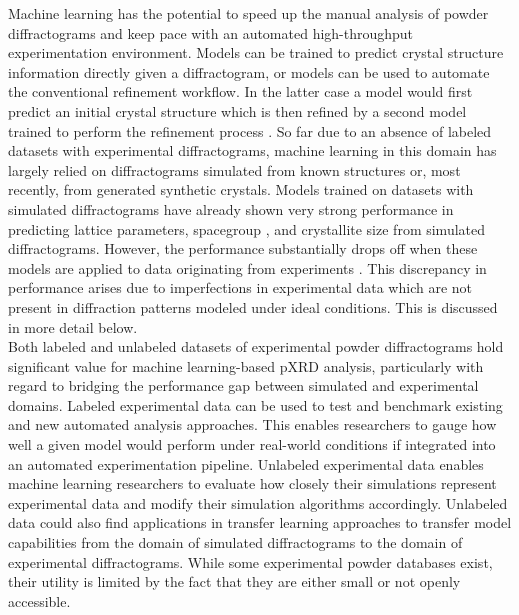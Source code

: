 Machine learning has the potential to speed up the manual analysis of powder diffractograms and keep pace with an automated high-throughput experimentation environment\cite{Agrawal2019, Surdu2023}.
Models can be trained to predict crystal structure information directly given a diffractogram, or models can be used to automate the conventional refinement workflow. In the latter case a model would first predict an initial crystal structure \cite{Surdu2023} which is then refined by a second model trained to perform the refinement process \cite{Feng2019}. So far due to an absence of labeled datasets with experimental diffractograms\cite{Wang2020}, machine learning in this domain has largely relied on diffractograms simulated from known structures\cite{Park2017, Lee2023} or, most recently, from generated synthetic crystals\cite{Schopmans2023}. 
Models trained on datasets with simulated diffractograms have already shown very strong performance in predicting lattice parameters\cite{Dong2021, Chitturi2021, Habershon2004, zhang2024crystallographic}, spacegroup \cite{cao2024simxrd, Schopmans2023, Oviedo2018, Park2017, Vecsei2018, Zaloga2020, Suzuki2020, Chakraborty2021,zhang2024crystallographic}, and crystallite size \cite{Dong2021, Chakraborty2021} from simulated diffractograms.
However, the performance substantially drops off when these models are applied to data originating from experiments \cite{cao2024simxrd, Schopmans2023,zhang2024crystallographic, Wang2020, Vecsei2018}. This discrepancy in performance arises due to imperfections in experimental data which are not present in diffraction patterns modeled under ideal conditions. This is discussed in more detail below. \\

Both labeled and unlabeled datasets of experimental powder diffractograms hold significant value for machine learning-based pXRD analysis, particularly with regard to bridging the performance gap between simulated and experimental domains. Labeled experimental data can be used to test and benchmark existing and new automated analysis approaches. This enables researchers to gauge how well a given model would perform under real-world conditions if integrated into an automated experimentation pipeline. Unlabeled experimental data enables machine learning researchers to evaluate how closely their simulations represent experimental data and modify their simulation algorithms accordingly. Unlabeled data could also find applications in transfer learning approaches to transfer model capabilities from the domain of simulated diffractograms to the domain of experimental diffractograms. While some experimental powder databases exist, their utility is limited by the fact that they are either small or not openly accessible. \\

